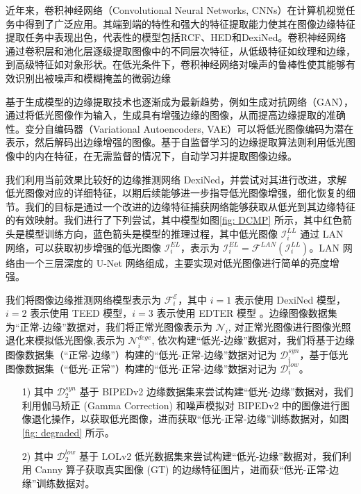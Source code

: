 \documentclass[a4paper]{ctexart}
\begin{document}
	近年来，卷积神经网络（Convolutional Neural Networks, CNNs）在计算机视觉任务中得到了广泛应用。其端到端的特性和强大的特征提取能力使其在图像边缘特征提取任务中表现出色，代表性的模型包括RCF、HED和DexiNed。卷积神经网络通过卷积层和池化层逐级提取图像中的不同层次特征，从低级特征如纹理和边缘，到高级特征如对象形状。在低光条件下，卷积神经网络对噪声的鲁棒性使其能够有效识别出被噪声和模糊掩盖的微弱边缘
	
	基于生成模型的边缘提取技术也逐渐成为最新趋势，例如生成对抗网络（GAN），通过将低光图像作为输入，生成具有增强边缘的图像，从而提高边缘提取的准确性。变分自编码器（Variational Autoencoders, VAE）可以将低光图像编码为潜在表示，然后解码出边缘增强的图像。基于自监督学习的边缘提取算法则利用低光图像中的内在特征，在无需监督的情况下，自动学习并提取图像边缘。
	
	我们利用当前效果比较好的边缘推测网络 DexiNed，并尝试对其进行改进，求解低光图像对应的详细特征，以期后续能够进一步指导低光图像增强，细化恢复的细节。我们的目标是通过一个改进的边缘特征捕获网络能够获取从低光到其边缘特征的有效映射。我们进行了下列尝试，其中模型如图\ref{fig: DCMP} 所示，其中红色箭头是模型训练方向，蓝色箭头是模型的推理过程，其中低光图像 $\mathcal{I}_{i}^{LL}$ 通过 LAN 网络，可以获取初步增强的低光图像 $\mathcal{I}_{i}^{EL}$，表示为 $\mathcal{I}_{i}^{EL} = \mathcal{F}^{LAN} (\mathcal{I}_{i}^{LL})$。LAN 网络由一个三层深度的 U-Net 网络组成，主要实现对低光图像进行简单的亮度增强。
	
	我们将图像边缘推测网络模型表示为 $\mathcal{F}_{i}^{\mathcal{E}}$，其中 $i=1$ 表示使用 DexiNed \cite{Soria_2023}模型，$i=2$ 表示使用 TEED \cite{soria2023tiny}模型，$i=3$ 表示使用 EDTER \cite{pu2022edter}模型 。边缘图像数据集为“正常-边缘”数据对，我们将正常光图像表示为 $\mathcal{N}_{i}$, 对正常光图像进行图像光照退化来模拟低光图像,表示为 $\mathcal{N}_{i}^{dege}$, 依次构建“低光-边缘”数据对，我们将基于边缘图像数据集（“正常-边缘”）构建的“低光-正常-边缘”数据对记为 $\mathcal{D}_{i}^{syn}$，基于低光图像数据集（“低光-正常”）构建的“低光-正常-边缘”数据对记为 $\mathcal{D}_{i}^{low}$。
	
	\begin{itemize}
		\item[1)]
		其中 $\mathcal{D}_{2}^{syn}$ 基于 BIPEDv2 边缘数据集来尝试构建“低光-边缘”数据对，我们利用伽马矫正 (Gamma Correction) 和噪声模拟对 BIPEDv2 中的图像进行图像退化操作，以获取低光图像，进而获取“低光-正常-边缘”训练数据对，如图\ref{fig: degraded} 所示。
		
		\item[2)]
		其中 $\mathcal{D}_{2}^{low}$ 基于 LOLv2 低光数据集来尝试构建“低光-边缘”数据对，我们利用 Canny 算子获取真实图像 (GT) 的边缘特征图片，进而获“低光-正常-边缘”训练数据对。
	\end{itemize}
	
\end{document}
